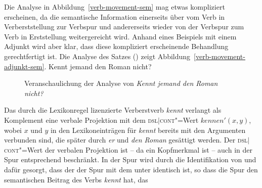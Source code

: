 Die Analyse in Abbildung~\ref{verb-movement-sem} mag etwas kompliziert erscheinen, da die semantische
Information einerseits über \dsl vom Verb in Verberststellung zur Verbspur und andererseits wieder von
der Verbspur zum Verb in Erststellung weitergereicht wird. Anhand eines Beispiels mit einem Adjunkt
wird aber klar, dass diese kompliziert erscheinende Behandlung gerechtfertigt ist. Die Analyse des
Satzes () zeigt Abbildung~\vref{verb-movement-adjunkt-sem}.
\ea
Kennt jemand den Roman nicht?
\z
\begin{figure}
\caption{\label{verb-movement-adjunkt-sem}Veranschaulichung der Analyse von \emph{Kennt jemand den Roman nicht?}}
\end{figure}
Das durch die Lexikonregel lizenzierte Verberstverb \emph{kennt} verlangt als Komplement eine
verbale Projektion mit dem \textsc{dsl$|$cont}"=Wert $kennen'(x, y)$, wobei $x$ und $y$ in den
Lexikoneinträgen für \emph{kennt} bereits mit den Argumenten verbunden sind, die später durch
\emph{er} und \emph{den Roman} gesättigt werden. Der \textsc{dsl$|$cont}"=Wert der verbalen Projektion
ist -- da \dsl ein Kopfmerkmal ist -- auch in der Spur entsprechend beschränkt. In der Spur wird
durch die Identifikation von \dsl und \local dafür gesorgt, dass der \contw der Spur mit dem \contw
unter \dsl identisch ist, so dass die Spur den semantischen Beitrag des Verbs \emph{kennt} hat, das
